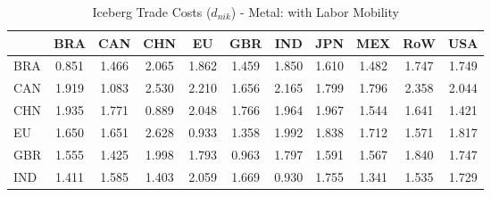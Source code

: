 \begin{table}[htbp]
\centering
\caption{Iceberg Trade Costs ($d_{nik}$) - Metal: with Labor Mobility} 
\label{tab:iceberg_Metal}
\begin{tabular}{lcccccccccc}
  \hline
 & BRA & CAN & CHN & EU & GBR & IND & JPN & MEX & RoW & USA \\ 
  \hline
BRA & \textcolor[RGB]{250,162,5}{0.851} & \textcolor[RGB]{201,130,54}{1.466} & \textcolor[RGB]{18,12,237}{2.065} & \textcolor[RGB]{59,38,196}{1.862} & \textcolor[RGB]{204,132,51}{1.459} & \textcolor[RGB]{69,45,186}{1.850} & \textcolor[RGB]{153,99,102}{1.610} & \textcolor[RGB]{191,124,64}{1.482} & \textcolor[RGB]{115,74,140}{1.747} & \textcolor[RGB]{110,71,145}{1.749} \\ 
  CAN & \textcolor[RGB]{43,28,212}{1.919} & \textcolor[RGB]{230,148,26}{1.083} & \textcolor[RGB]{3,2,252}{2.530} & \textcolor[RGB]{10,7,245}{2.210} & \textcolor[RGB]{130,84,125}{1.656} & \textcolor[RGB]{13,8,242}{2.165} & \textcolor[RGB]{87,56,168}{1.799} & \textcolor[RGB]{92,59,163}{1.796} & \textcolor[RGB]{8,5,247}{2.358} & \textcolor[RGB]{28,18,227}{2.044} \\ 
  CHN & \textcolor[RGB]{41,26,214}{1.935} & \textcolor[RGB]{99,64,156}{1.771} & \textcolor[RGB]{245,158,10}{0.889} & \textcolor[RGB]{25,16,230}{2.048} & \textcolor[RGB]{102,66,153}{1.766} & \textcolor[RGB]{38,25,217}{1.964} & \textcolor[RGB]{36,23,219}{1.967} & \textcolor[RGB]{178,115,76}{1.544} & \textcolor[RGB]{143,92,112}{1.641} & \textcolor[RGB]{212,137,43}{1.421} \\ 
  EU & \textcolor[RGB]{138,89,117}{1.650} & \textcolor[RGB]{135,87,120}{1.651} & \textcolor[RGB]{0,0,255}{2.628} & \textcolor[RGB]{240,155,15}{0.933} & \textcolor[RGB]{219,142,36}{1.358} & \textcolor[RGB]{33,21,222}{1.992} & \textcolor[RGB]{77,50,178}{1.838} & \textcolor[RGB]{122,79,133}{1.712} & \textcolor[RGB]{166,107,89}{1.571} & \textcolor[RGB]{82,53,173}{1.817} \\ 
  GBR & \textcolor[RGB]{173,112,82}{1.555} & \textcolor[RGB]{209,135,46}{1.425} & \textcolor[RGB]{31,20,224}{1.998} & \textcolor[RGB]{94,61,161}{1.793} & \textcolor[RGB]{235,152,20}{0.963} & \textcolor[RGB]{89,58,166}{1.797} & \textcolor[RGB]{156,101,99}{1.591} & \textcolor[RGB]{171,111,84}{1.567} & \textcolor[RGB]{71,46,184}{1.840} & \textcolor[RGB]{112,73,143}{1.747} \\ 
  IND & \textcolor[RGB]{214,139,41}{1.411} & \textcolor[RGB]{163,106,92}{1.585} & \textcolor[RGB]{217,140,38}{1.403} & \textcolor[RGB]{23,15,232}{2.059} & \textcolor[RGB]{128,82,128}{1.669} & \textcolor[RGB]{242,157,13}{0.930} & \textcolor[RGB]{105,68,150}{1.755} & \textcolor[RGB]{222,144,33}{1.341} & \textcolor[RGB]{181,117,74}{1.535} & \textcolor[RGB]{117,76,138}{1.729} \\ 

\end{tabular}
\end{table}
